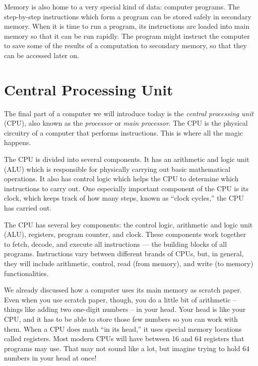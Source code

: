 Memory is also home to a very special kind of data: computer programs. The step-by-step instructions which form a program can be stored safely in secondary memory. When it is time to run a program, its instructions are loaded into main memory so that it can be run rapidly. The program might instruct the computer to save some of the results of a computation to secondary memory, so that they can be accessed later on.


\section {Central Processing Unit}

The final part of a computer we will introduce today is the \emph{central processing unit} (CPU), also known as the \emph{processor} or \emph{main processor}. The CPU is the physical circuitry of a computer that performs instructions. This is where all the magic happens.

The CPU is divided into several components. It has an arithmetic and logic unit (ALU) which is responsible for physically carrying out basic mathematical operations. It also has control logic which helps the CPU to determine which instructions to carry out. One especially important component of the CPU is its clock, which keeps track of how many steps, known as ``clock cycles,'' the CPU has carried out.

The CPU has several key components: the control logic, arithmetic and logic unit (ALU), registers, program counter, and clock. These components work together to 
fetch, decode, and execute all instructions --- the building blocks of all programs. Instructions vary between different brands of CPUs, but, in general, they will include arithmetic, control, read (from memory), and write (to memory) functionalities.

We already discussed how a computer uses its main memory as scratch paper. Even when you use scratch paper, though, you do a little bit of arithmetic -- things like adding two one-digit numbers -- in your head. Your head is like your CPU, and it has to be able to store those few numbers so you can work with them. When a CPU does math ``in its head,'' it uses special memory locations called registers. Most modern CPUs will have between 16 and 64 registers that programs may use. That may not sound like a lot, but imagine trying to hold 64 numbers in your head at once!

